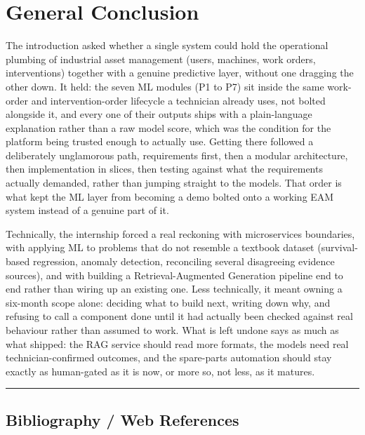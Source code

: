 \chapter*{General Conclusion}

The introduction asked whether a single system could hold the operational plumbing of industrial asset management (users, machines, work orders, interventions) together with a genuine predictive layer, without one dragging the other down. It held: the seven ML modules (P1 to P7) sit inside the same work-order and intervention-order lifecycle a technician already uses, not bolted alongside it, and every one of their outputs ships with a plain-language explanation rather than a raw model score, which was the condition for the platform being trusted enough to actually use. Getting there followed a deliberately unglamorous path, requirements first, then a modular architecture, then implementation in slices, then testing against what the requirements actually demanded, rather than jumping straight to the models. That order is what kept the ML layer from becoming a demo bolted onto a working EAM system instead of a genuine part of it.

Technically, the internship forced a real reckoning with microservices boundaries, with applying ML to problems that do not resemble a textbook dataset (survival-based regression, anomaly detection, reconciling several disagreeing evidence sources), and with building a Retrieval-Augmented Generation pipeline end to end rather than wiring up an existing one. Less technically, it meant owning a six-month scope alone: deciding what to build next, writing down why, and refusing to call a component done until it had actually been checked against real behaviour rather than assumed to work. What is left undone says as much as what shipped: the RAG service should read more formats, the models need real technician-confirmed outcomes, and the spare-parts automation should stay exactly as human-gated as it is now, or more so, not less, as it matures.

\vspace{1em}
\noindent\rule{\textwidth}{0.4pt}

\section*{Bibliography / Web References}

